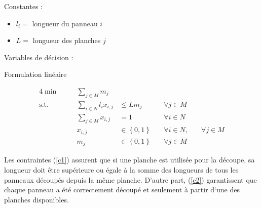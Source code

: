 \documentclass{article}[A4]
\begin{document}
Constantes :
\begin{itemize}
    \item[] $l_{i} =$ longueur du panneau $i$
    \item[] $L =$ longueur des planches $j$
\end{itemize}

Variables de décision :
\begin{algorithm}[H]
\caption{Formulation linéaire}
\begin{alignat}{4}
    \min        &\quad& \sum\limits_{j \in M} m_{j}                        &                                   &\tag{I} \label{I}\\
	\text{s.t.} &\quad& \sum\limits_{i \in N} l_{i} x_{i,j}                &\leq L m_{j}                       &\quad\forall j \in M \label{c1}\\ 
                &\quad& \sum\limits_{j \in M} x_{i,j}                      & = 1                               &\quad\forall i \in N \label{c2}\\
                &\quad& x_{i,j}                                            &\in \left\{0, 1\right\}            &\quad\forall i \in N, &\quad\forall j \in M\\
                &\quad& m_{j}                                              &\in \left\{0, 1\right\}            &\quad\forall j \in M
\end{alignat}
\end{algorithm}

Les contraintes (\ref{c1}) assurent que si une planche est utilisée pour la 
découpe, sa longueur doit être supérieure ou égale à la somme des 
longueurs de tous les panneaux découpés depuis la même planche. 
D'autre part, (\ref{c2}) garantissent que chaque panneau a été correctement 
découpé et seulement à partir d`une des planches disponibles.
\end{document}
